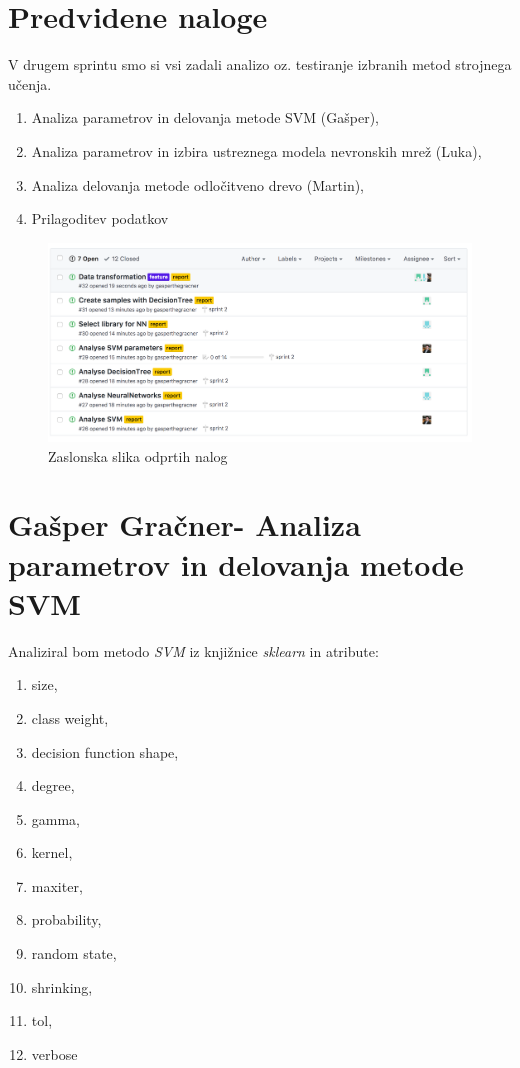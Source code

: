 \documentclass[a4paper,11pt]{article}
\begin{document}
\section{Predvidene naloge}
V drugem sprintu smo si vsi zadali analizo oz. testiranje izbranih metod strojnega učenja.
	\begin{enumerate}
		\item{Analiza parametrov in delovanja metode SVM (Gašper),}
		\item{Analiza parametrov in izbira ustreznega modela nevronskih mrež (Luka),}
		\item{Analiza delovanja metode odločitveno drevo (Martin),}
		\item{Prilagoditev podatkov}
	\end{enumerate}
	
\begin{figure}[h]
\caption{Zaslonska slika odprtih nalog}
\centering
\includegraphics[width=1\textwidth]{issues}
\end{figure}

\newpage
\section{Gašper Gračner- Analiza parametrov in delovanja metode SVM}
Analiziral bom metodo \textit{SVM} iz knjižnice \textit{sklearn} in atribute:
\begin{enumerate}
	\item {size,}
	\item {class weight,}
	\item {decision function shape,}
	\item {degree,}
	\item {gamma,}
	\item {kernel,}
	\item {maxiter,}
	\item {probability,}
	\item {random state,}
	\item {shrinking,}
	\item {tol,}
	\item {verbose}
\end{enumerate}
\end{document}
